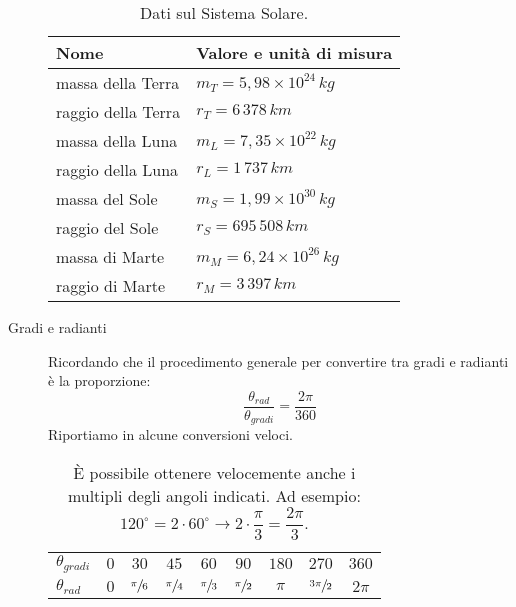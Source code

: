 \documentclass[a4paper,11pt,italian]{article}
\begin{document}
\begin{description}
\begin{soloscientifico}
  \begin{table}[htp]\centering
    \begin{tabular}{ll}\toprule
      \textbf{Nome} & \textbf{Valore e unità di misura}\\\midrule
      massa della Terra & $ m_T = 5,98 \times 10^{24} \, kg	$ \\\addlinespace[.2em]
      raggio della Terra & $ r_T = 6 \, 378 \, km $ \\\addlinespace[.2em]
      massa della Luna & $ m_L = 7,35 \times 10^{22} \, kg $ \\\addlinespace[.2em]
      raggio della Luna & $ r_L = 1 \, 737 \, km $ \\\addlinespace[.2em]
      massa del Sole & $ m_S = 1,99 \times 10^{30} \, kg $ \\\addlinespace[.2em]
      raggio del Sole & $ r_S = 695 \, 508 \, km $ \\\addlinespace[.2em]
      massa di Marte & $ m_M = 6,24 \times 10^{26} \, kg $ \\\addlinespace[.2em]
      raggio di Marte & $ r_M = 3 \, 397 \, km $ \\\bottomrule
    \end{tabular}
  \caption{Dati sul Sistema Solare.}
    \label{tab:datisistemasolare}
  \end{table}  
\end{soloscientifico}   %

  \item[Gradi e radianti] Ricordando che il procedimento generale per convertire tra gradi e radianti è la proporzione:
  \[ \frac{\theta_{rad}}{\theta_{gradi}} = \frac{2\pi}{360} \]
  Riportiamo in  alcune conversioni veloci.
  \begin{table}[htp]\centering
    \begin{tabular}{lcccccccc}\toprule
        \boldmath$ \theta_{gradi} $ & $ 0 $ & $ 30 $ & $ 45 $ & $ 60 $ & $ 90 $ & $ 180 $ & $ 270 $ & $ 360 $\\\addlinespace[.2em]\midrule
        \boldmath$ \theta_{rad} $ & $ 0 $ & $ \sfrac{\pi}{6} $ & $ \sfrac{\pi}{4} $ & $ \sfrac{\pi}{3} $ & $ \sfrac{\pi}{2} $ & $ \pi $ & $ \sfrac{3\pi}{2} $ & $ 2\pi $\\\bottomrule
    \end{tabular}
    \caption{È possibile ottenere velocemente anche i multipli degli angoli indicati. Ad esempio: $ 120^{\circ} = 2\cdot 60^{\circ} \rightarrow 2 \cdot \dfrac{\pi}{3} = \dfrac{2\pi}{3} $.}\label{tab:gradiradianti}
  \end{table}
\end{description}
\end{document}
